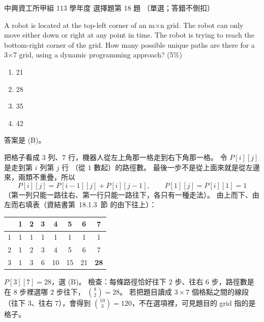 \begin{pastexam}[label={px:nchu-113-dsa-18}]{中興資工所甲組 113 學年度 選擇題第 18 題}
（單選；答錯不倒扣）

A robot is located at the top-left corner of an m$\times$n grid. The robot can only move either down or
right at any point in time. The robot is trying to reach the bottom-right corner of the grid. How many
possible unique paths are there for a 3$\times$7 grid, using a dynamic programming approach? (5\%)
\begin{enumerate}[label=(\Alph*)]
\item 21
\item 28
\item 35
\item 42
\end{enumerate}
\end{pastexam}

\begin{pastsoln}
答案是 (B)。

把格子看成 $3$ 列、$7$ 行，機器人從左上角那一格走到右下角那一格。 令 $P[i][j]$ 是走到第 $i$ 列第 $j$ 行
（從 $1$ 數起）的路徑數。 最後一步不是從上面來就是從左邊來，兩類不重疊，所以
\[
P[i][j] = P[i-1][j] + P[i][j-1],\qquad P[1][j] = P[i][1] = 1
\]
（第一列只能一路往右、第一行只能一路往下，各只有一種走法）。 由上而下、由左而右填表（資結書第~18.1.3~節
的由下往上）：
\begin{center}
\begin{tabular}{c|ccccccc}
 & 1 & 2 & 3 & 4 & 5 & 6 & 7 \\
\hline
1 & 1 & 1 & 1 & 1 & 1 & 1 & 1 \\
2 & 1 & 2 & 3 & 4 & 5 & 6 & 7 \\
3 & 1 & 3 & 6 & 10 & 15 & 21 & \textbf{28} \\
\end{tabular}
\end{center}
$P[3][7] = 28$，選 (B)。 檢查：每條路徑恰好往下 $2$ 步、往右 $6$ 步，路徑數是在 $8$ 步裡選哪 $2$ 步往下，
$\binom{8}{2} = 28$。 若把題目讀成 $3 \times 7$ 個格點之間的線段（往下 $3$、往右 $7$），會得到
$\binom{10}{3} = 120$，不在選項裡，可見題目的 grid 指的是格子。
\end{pastsoln}
